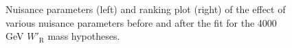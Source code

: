\begin{figure}[H]
  \centering
  \caption{Nuisance parameters (left) and ranking plot (right) of the effect of various nuisance parameters before and after the fit for the 4000 GeV $W'_{\text{R}}$ mass hypotheses.}
  \label{fig:NuisParAndRanking_WpRH4000}
\end{figure}
